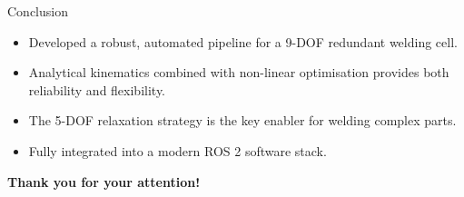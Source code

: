 \documentclass[10pt, aspectratio=169]{beamer}
\begin{document}
\begin{frame}{Conclusion}
    \begin{itemize}
        \item Developed a robust, automated pipeline for a 9-DOF redundant welding cell.
        \item Analytical kinematics combined with non-linear optimisation provides both reliability and flexibility.
        \item The 5-DOF relaxation strategy is the key enabler for welding complex parts.
        \item Fully integrated into a modern ROS 2 software stack.
    \end{itemize}
    
    \vspace{0.5cm}
    \begin{center}
        \Large \textbf{Thank you for your attention!}
    \end{center}
\end{frame}
\end{document}
